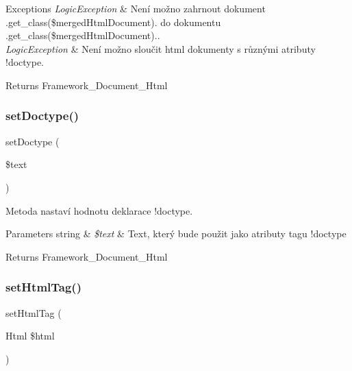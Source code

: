 \begin{DoxyExceptions}{Exceptions}
{\em Logic\+Exception} & \textquotesingle{}Není možno zahrnout dokument \textquotesingle{}.get\+\_\+class(\$merged\+Html\+Document).\textquotesingle{} do dokumentu \textquotesingle{}.get\+\_\+class(\$merged\+Html\+Document).\textquotesingle{}.\textquotesingle{} \\
\hline
{\em Logic\+Exception} & Není možno sloučit html dokumenty s různými atributy !doctype. \\
\hline
\end{DoxyExceptions}
\begin{DoxyReturn}{Returns}
Framework\+\_\+\+Document\+\_\+\+Html 
\end{DoxyReturn}
\mbox{\label{class_pes_1_1_document_1_1_html_document_aaaabeacc0ec5297805e1d716d54cda6d}} 
\subsubsection{\texorpdfstring{set\+Doctype()}{setDoctype()}}
{\footnotesize\ttfamily set\+Doctype (\begin{DoxyParamCaption}\item[{}]{\$text }\end{DoxyParamCaption})}

Metoda nastaví hodnotu deklarace !doctype. 
\begin{DoxyParams}[1]{Parameters}
string & {\em \$text} & Text, který bude použit jako atributy tagu !doctype \\
\hline
\end{DoxyParams}
\begin{DoxyReturn}{Returns}
Framework\+\_\+\+Document\+\_\+\+Html 
\end{DoxyReturn}
\mbox{\label{class_pes_1_1_document_1_1_html_document_a30320351a7d1f6b27b5540877a20ffde}} 
\subsubsection{\texorpdfstring{set\+Html\+Tag()}{setHtmlTag()}}
{\footnotesize\ttfamily set\+Html\+Tag (\begin{DoxyParamCaption}\item[{Html}]{\$html }\end{DoxyParamCaption})}

